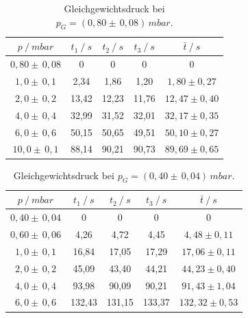 \begin{table}[H]
\centering
\begin{tabular}{c|c|c|c|c}
	{$p \:/\: \si{mbar}$} & {$t_1 \:/\: \si{s} $} & {$t_2 \:/\: \si{s} $} & {$t_3 \:/\: \si{s} $} & {$\bar{t} \:/\: \si{s}$}\\
\midrule
$0,80 \pm \, 0,08$ &0 &0 &0 &0\\
$1,0 \pm \, 0,1$ &   2,34 &  1,86 &  1,20 & $1,80 \pm 0,27$\\
$2,0 \pm \, 0,2$ &   13,42  &  12,23 &  11,76 & $12,47 \pm 0,40 $\\
$4,0 \pm \, 0,4$ &   32,99 &  31,52 &  32,01 & $32,17 \pm 0,35 $\\
$6,0 \pm \, 0,6$  &   50,15 &  50,65 &  49,51 & $50,10 \pm 0,27 $\\
$10,0 \pm \, 0,1$ &   88,14 &  90,21 &  90,73 & $89,69 \pm 0,65 $\\
\end{tabular}
\caption{Gleichgewichtsdruck bei $p_G=(0,80 \pm \, 0,08) \, \si{mbar}$.}
\label{tab:leck_Dreh2}
\end{table}

\begin{table}[H]
\centering
\begin{tabular}{c|c|c|c|c}
	{$p \:/\: \si{mbar}$} & {$t_1 \:/\: \si{s} $} & {$t_2 \:/\: \si{s} $} & {$t_3 \:/\: \si{s} $} & {$\bar{t} \:/\: \si{s}$}\\
\midrule
$0,40 \pm \, 0,04$ &0 &0 &0 &0\\
$0,60 \pm \, 0,06$ &   4,26 &  4,72 &  4,45 & $4,48 \pm 0,11$\\
$1,0 \pm \, 0,1$ &   16,84  &  17,05 &  17,29 & $17,06 \pm 0,11 $\\
$2,0 \pm \, 0,2$ &   45,09 &  43,40 &  44,21 & $44,23 \pm 0,40 $\\
$4,0 \pm \, 0,4$ &   93,98 &  90,09 & 90,21 & $91,43 \pm 1,04 $\\
$6,0 \pm \, 0,6$ &   132,43 &  131,15 &  133,37 & $132,32 \pm 0,53 $\\
\end{tabular}
\caption{Gleichgewichtsdruck bei $p_G=(0,40 \pm \, 0,04) \, \si{mbar}$.}
\label{tab:leck_Dreh3}
\end{table}

